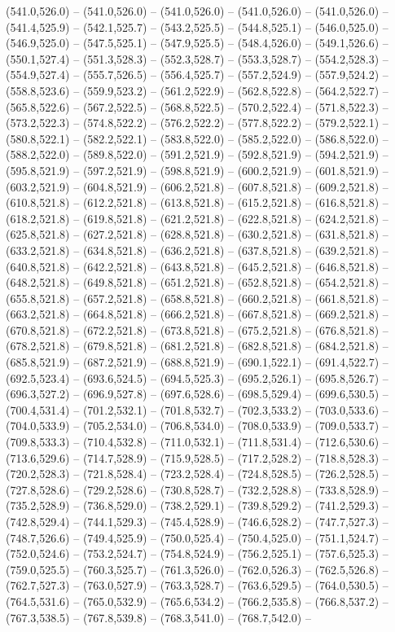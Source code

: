  (541.0,526.0) -- (541.0,526.0) -- (541.0,526.0) -- (541.0,526.0) -- (541.0,526.0) -- (541.4,525.9) -- (542.1,525.7) -- (543.2,525.5) -- (544.8,525.1) -- (546.0,525.0) -- (546.9,525.0) -- (547.5,525.1) -- (547.9,525.5) -- (548.4,526.0) -- (549.1,526.6) -- (550.1,527.4) -- (551.3,528.3) -- (552.3,528.7) -- (553.3,528.7) -- (554.2,528.3) -- (554.9,527.4) -- (555.7,526.5) -- (556.4,525.7) -- (557.2,524.9) -- (557.9,524.2) -- (558.8,523.6) -- (559.9,523.2) -- (561.2,522.9) -- (562.8,522.8) -- (564.2,522.7) -- (565.8,522.6) -- (567.2,522.5) -- (568.8,522.5) -- (570.2,522.4) -- (571.8,522.3) -- (573.2,522.3) -- (574.8,522.2) -- (576.2,522.2) -- (577.8,522.2) -- (579.2,522.1) -- (580.8,522.1) -- (582.2,522.1) -- (583.8,522.0) -- (585.2,522.0) -- (586.8,522.0) -- (588.2,522.0) -- (589.8,522.0) -- (591.2,521.9) -- (592.8,521.9) -- (594.2,521.9) -- (595.8,521.9) -- (597.2,521.9) -- (598.8,521.9) -- (600.2,521.9) -- (601.8,521.9) -- (603.2,521.9) -- (604.8,521.9) -- (606.2,521.8) -- (607.8,521.8) -- (609.2,521.8) -- (610.8,521.8) -- (612.2,521.8) -- (613.8,521.8) -- (615.2,521.8) -- (616.8,521.8) -- (618.2,521.8) -- (619.8,521.8) -- (621.2,521.8) -- (622.8,521.8) -- (624.2,521.8) -- (625.8,521.8) -- (627.2,521.8) -- (628.8,521.8) -- (630.2,521.8) -- (631.8,521.8) -- (633.2,521.8) -- (634.8,521.8) -- (636.2,521.8) -- (637.8,521.8) -- (639.2,521.8) -- (640.8,521.8) -- (642.2,521.8) -- (643.8,521.8) -- (645.2,521.8) -- (646.8,521.8) -- (648.2,521.8) -- (649.8,521.8) -- (651.2,521.8) -- (652.8,521.8) -- (654.2,521.8) -- (655.8,521.8) -- (657.2,521.8) -- (658.8,521.8) -- (660.2,521.8) -- (661.8,521.8) -- (663.2,521.8) -- (664.8,521.8) -- (666.2,521.8) -- (667.8,521.8) -- (669.2,521.8) -- (670.8,521.8) -- (672.2,521.8) -- (673.8,521.8) -- (675.2,521.8) -- (676.8,521.8) -- (678.2,521.8) -- (679.8,521.8) -- (681.2,521.8) -- (682.8,521.8) -- (684.2,521.8) -- (685.8,521.9) -- (687.2,521.9) -- (688.8,521.9) -- (690.1,522.1) -- (691.4,522.7) -- (692.5,523.4) -- (693.6,524.5) -- (694.5,525.3) -- (695.2,526.1) -- (695.8,526.7) -- (696.3,527.2) -- (696.9,527.8) -- (697.6,528.6) -- (698.5,529.4) -- (699.6,530.5) -- (700.4,531.4) -- (701.2,532.1) -- (701.8,532.7) -- (702.3,533.2) -- (703.0,533.6) -- (704.0,533.9) -- (705.2,534.0) -- (706.8,534.0) -- (708.0,533.9) -- (709.0,533.7) -- (709.8,533.3) -- (710.4,532.8) -- (711.0,532.1) -- (711.8,531.4) -- (712.6,530.6) -- (713.6,529.6) -- (714.7,528.9) -- (715.9,528.5) -- (717.2,528.2) -- (718.8,528.3) -- (720.2,528.3) -- (721.8,528.4) -- (723.2,528.4) -- (724.8,528.5) -- (726.2,528.5) -- (727.8,528.6) -- (729.2,528.6) -- (730.8,528.7) -- (732.2,528.8) -- (733.8,528.9) -- (735.2,528.9) -- (736.8,529.0) -- (738.2,529.1) -- (739.8,529.2) -- (741.2,529.3) -- (742.8,529.4) -- (744.1,529.3) -- (745.4,528.9) -- (746.6,528.2) -- (747.7,527.3) -- (748.7,526.6) -- (749.4,525.9) -- (750.0,525.4) -- (750.4,525.0) -- (751.1,524.7) -- (752.0,524.6) -- (753.2,524.7) -- (754.8,524.9) -- (756.2,525.1) -- (757.6,525.3) -- (759.0,525.5) -- (760.3,525.7) -- (761.3,526.0) -- (762.0,526.3) -- (762.5,526.8) -- (762.7,527.3) -- (763.0,527.9) -- (763.3,528.7) -- (763.6,529.5) -- (764.0,530.5) -- (764.5,531.6) -- (765.0,532.9) -- (765.6,534.2) -- (766.2,535.8) -- (766.8,537.2) -- (767.3,538.5) -- (767.8,539.8) -- (768.3,541.0) -- (768.7,542.0) -- 
